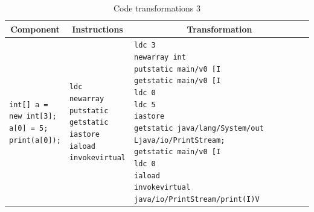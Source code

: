 \begin{table}[bth]
	\footnotesize
	\centering
	\caption{Code transformations 3}
	\label{tab:trans3}
	\begin{tabular}{|l|l|l|}
		\hline
		\multicolumn{1}{|c|}{\textbf{Component}} & \multicolumn{1}{c|}{\textbf{Instructions}} & \multicolumn{1}{c|}{\textbf{Transformation}} \\ \hline	
		\makecell[l]{\texttt{int[] a =} \\ \texttt{new int[3];} \\ \texttt{a[0] = 5;} \\ \texttt{print(a[0]);}} & \makecell[l]{\texttt{ldc} \\ \texttt{newarray} \\ \texttt{putstatic} \\ \texttt{getstatic} \\ \texttt{iastore} \\ \texttt{iaload} \\ \texttt{invokevirtual}} & \makecell[l]{\texttt{ldc 3} \\ \texttt{newarray int} \\ \texttt{putstatic main/v0 [I} \\ \texttt{getstatic main/v0 [I} \\ \texttt{ldc 0} \\ \texttt{ldc 5} \\ \texttt{iastore} \\ \texttt{getstatic java/lang/System/out Ljava/io/PrintStream;} \\ \texttt{getstatic main/v0 [I} \\ \texttt{ldc 0} \\ \texttt{iaload} \\ \texttt{invokevirtual java/io/PrintStream/print(I)V}} \\ \hline
			

\end{tabular}
\end{table}
